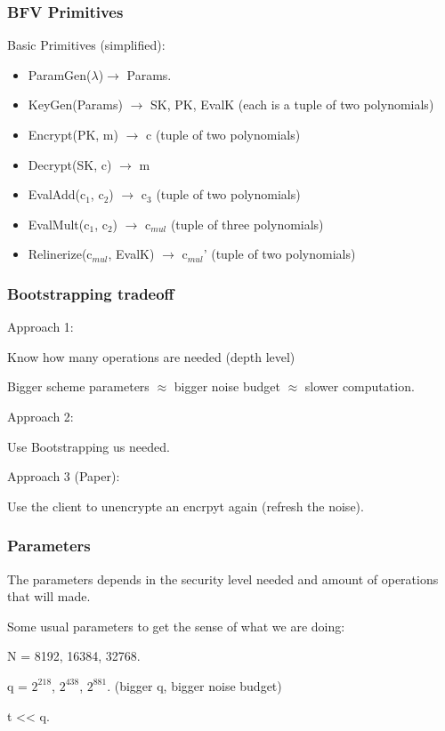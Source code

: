 \documentclass[10pt,handout]{beamer}
\begin{document}
\begin{frame}
\frametitle{BFV Primitives}

    Basic Primitives (simplified):
\begin{itemize}
    \item ParamGen($\lambda$)$\rightarrow$ Params.
    \item KeyGen(Params) $\rightarrow$ SK, PK, EvalK (each is a tuple of two polynomials)
   \item Encrypt(PK, m) $\rightarrow$ c (tuple of two polynomials)
    \item Decrypt(SK, c) $\rightarrow$ m
    \item EvalAdd(c$_1$, c$_2$) $\rightarrow$ c$_3$ (tuple of two polynomials)
    \item EvalMult(c$_1$, c$_2$) $\rightarrow$ c$_{mul}$ (tuple of three polynomials)
    \item Relinerize(c$_{mul}$, EvalK) $\rightarrow$ c$_{mul}$' (tuple of two polynomials)
\end{itemize}

\end{frame}


\begin{frame}
    \frametitle{Bootstrapping tradeoff}

    Approach 1:

    Know how many operations are needed (depth level)

    Bigger scheme parameters $\approx$ bigger noise budget $\approx$ slower computation.

    Approach 2:

    Use Bootstrapping us needed.


    Approach 3 (Paper):

    Use the client to unencrypte an encrpyt again (refresh the noise).
\end{frame}




\begin{frame}
\frametitle{Parameters}

The parameters depends in the security level needed and amount of operations that will made.


Some usual parameters to get the sense of what we are doing:

N = 8192, 16384, 32768.

    q = $2^{218}$,   $2^{438}$,  $2^{881}$. (bigger q, bigger noise budget)

t  << q.



\end{frame}
\end{document}

